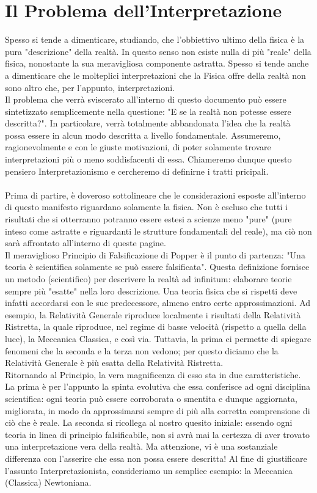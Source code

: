 \documentclass[]{scrbook}
\begin{document}
	\section{Il Problema dell'Interpretazione}
	Spesso si tende a dimenticare, studiando, che l'obbiettivo ultimo della fisica è la pura "descrizione" della realtà. In questo senso non esiste nulla di più "reale" della fisica, nonostante la sua meravigliosa componente astratta. Spesso si tende anche a dimenticare che le molteplici interpretazioni che la Fisica offre della realtà non sono altro che, per l'appunto, interpretazioni.  
	\\
	Il problema che verrà sviscerato all'interno di questo documento può essere sintetizzato semplicemente nella questione: "E se la realtà non potesse essere descritta?". In particolare, verrà totalmente abbandonata l'idea che la realtà possa essere in alcun modo descritta a livello fondamentale. Assumeremo, ragionevolmente e con le giuste motivazioni, di poter solamente trovare interpretazioni più o meno soddisfacenti di essa. Chiameremo dunque questo pensiero Interpretazionismo e cercheremo di definirne i tratti pricipali.\\
		\\
		Prima di partire, è doveroso sottolineare che le considerazioni esposte all'interno di questo manifesto riguardano solamente la fisica. Non è escluso che tutti i risultati che si otterranno potranno essere estesi a scienze meno "pure" (pure inteso come astratte e riguardanti le strutture fondamentali del reale), ma ciò non sarà affrontato all'interno di queste pagine. 
				\\
	Il meraviglioso Principio di Falsificazione di Popper è il punto di partenza: "Una teoria è scientifica solamente se può essere falsificata". Questa definizione fornisce un metodo (scientifico) per descrivere la realtà ad infinitum: elaborare teorie sempre più "esatte" nella loro descrizione. Una teoria fisica che si rispetti deve infatti accordarsi con le sue predecessore, almeno entro certe approssimazioni. Ad esempio, la Relatività Generale riproduce localmente i risultati della Relatività Ristretta, la quale riproduce, nel regime di basse velocità (rispetto a quella della luce), la Meccanica Classica, e così via. Tuttavia, la prima ci permette di spiegare fenomeni che la seconda e la terza non vedono; per questo diciamo che la Relatività Generale è più esatta della Relatività Ristretta. \\
	Ritornando al Principio, la vera magnificenza di esso sta in due caratteristiche. La prima è per l'appunto la spinta evolutiva che essa conferisce ad ogni disciplina scientifica: ogni teoria può essere corroborata o smentita e dunque aggiornata, migliorata, in modo da approssimarsi sempre di più alla corretta comprensione di ciò che è reale. La seconda si ricollega al nostro quesito iniziale: essendo ogni teoria in linea di principio falsificabile, non si avrà mai la certezza di aver trovato una interpretazione vera della realtà. Ma attenzione, vi è una sostanziale differenza con l'asserire che essa non possa essere descritta! Al fine di giustificare l'assunto Interpretazionista, consideriamo un semplice esempio: la Meccanica (Classica) Newtoniana.\\
\end{document}
